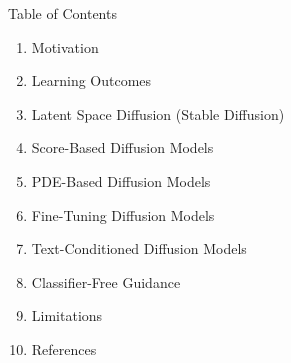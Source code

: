 \begin{frame}[allowframebreaks]{Table of Contents}
\begin{enumerate}
    \item Motivation
    \item Learning Outcomes
    \item Latent Space Diffusion (Stable Diffusion)
    \item Score-Based Diffusion Models
    \item PDE-Based Diffusion Models
    \item Fine-Tuning Diffusion Models
    \item Text-Conditioned Diffusion Models
    \item Classifier-Free Guidance
    \item Limitations
    \item References
\end{enumerate}
\end{frame}
